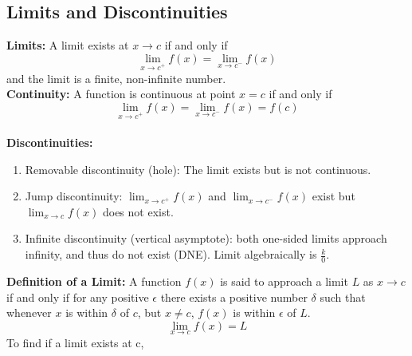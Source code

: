 \documentclass[12pt, letterpaper]{article}
\begin{document}
\subsection{Limits and Discontinuities}
\textbf{Limits:} A limit exists at $x\rightarrow c$ if and only if \[\lim_{x\rightarrow c^+}f(x)=\lim_{x\rightarrow c^-}f(x)\] and the limit is a finite, non-infinite number. \vspace{1em}\\
\textbf{Continuity:} A function is continuous at point $x=c$ if and only if \[\lim_{x\rightarrow c^+}f(x)=\lim_{x\rightarrow c^-}f(x)=f(c)\]  \vspace{1em}\\
\textbf{Discontinuities:}
\begin{enumerate}
    \item Removable discontinuity (hole): The limit exists but is not continuous.
    \item Jump discontinuity: $\lim_{x\rightarrow c^+}f(x)$ and $\lim_{x\rightarrow c^-}f(x)$ exist but $\lim_{x\rightarrow c}f(x)$ does not exist.
    \item Infinite discontinuity (vertical asymptote): both one-sided limits approach infinity, and thus do not exist (DNE). Limit algebraically is $\frac{k}{0}$.
\end{enumerate}
\textbf{Definition of a Limit:} A function $f(x)$ is said to approach a limit $L$ as $x\rightarrow c$ if and only if for any positive $\epsilon$ there exists a positive number $\delta$ such that whenever $x$ is within $\delta$ of $c$, but $x\neq c$, $f(x)$ is within $\epsilon$ of $L$. \[\lim_{x\rightarrow c}f(x)=L\]
To find if a limit exists at c, 
\end{document}
